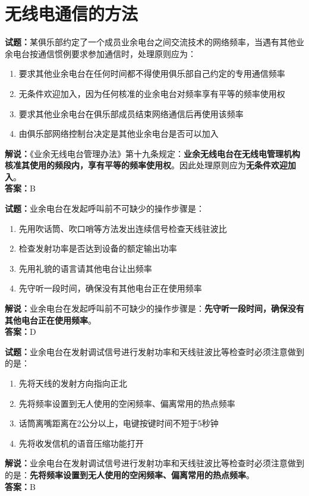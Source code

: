 \documentclass{ctexbook}
\begin{document}

\chapter{无线电通信的方法}

\newpage

\noindent\textbf{试题：}某俱乐部约定了一个成员业余电台之间交流技术的网络频率，当遇有其他业余电台按通信惯例要求参加通信时，处理原则应为：
\begin{enumerate}[leftmargin=3em]
	\item 要求其他业余电台在任何时间都不得使用俱乐部自己约定的专用通信频率
	\item 无条件欢迎加入，因为任何核准的业余电台对频率享有平等的频率使用权
	\item 要求其他业余电台在俱乐部成员结束网络通信后再使用该频率
	\item 由俱乐部网络控制台决定是其他业余电台是否可以加入
\end{enumerate}
\noindent\textbf{解说：}《业余无线电台管理办法》第十九条规定：\textbf{业余无线电台在无线电管理机构核准其使用的频段内，享有平等的频率使用权}。因此处理原则应为\textbf{无条件欢迎加入}。\\\noindent\textbf{答案：}B

\bigskip


\noindent\textbf{试题：}业余电台在发起呼叫前不可缺少的操作步骤是：
\begin{enumerate}[leftmargin=3em]
	\item 先用吹话筒、吹口哨等方法发出连续信号检查天线驻波比
	\item 检查发射功率是否达到设备的额定输出功率
	\item 先用礼貌的语言请其他电台让出频率
	\item 先守听一段时间，确保没有其他电台正在使用频率
\end{enumerate}
\noindent\textbf{解说：}业余电台在发起呼叫前不可缺少的操作步骤是：\textbf{先守听一段时间，确保没有其他电台正在使用频率}。\\\noindent\textbf{答案：}D%

\bigskip


\noindent\textbf{试题：}业余电台在发射调试信号进行发射功率和天线驻波比等检查时必须注意做到的是：
\begin{enumerate}[leftmargin=3em]
	\item 先将天线的发射方向指向正北
	\item 先将频率设置到无人使用的空闲频率、偏离常用的热点频率
	\item 话筒离嘴距离在2公分以上，电键按键时间不短于5秒钟
	\item 先将收发信机的语音压缩功能打开
\end{enumerate}
\noindent\textbf{解说：}业余电台在发射调试信号进行发射功率和天线驻波比等检查时必须注意做到的是：\textbf{先将频率设置到无人使用的空闲频率、偏离常用的热点频率}。\\\noindent\textbf{答案：}B
\end{document}
